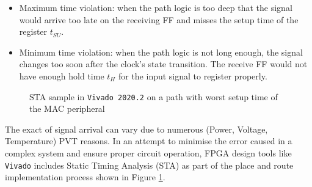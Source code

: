 \documentclass[a4paper]{report}
\newcommand{\code}{\texttt}
\begin{document}
\begin{itemize}
    \item Maximum time violation: when the path logic is too deep that the signal would arrive too late on the receiving FF and misses the setup time of the register $t_{SU}$.
    \item Minimum time violation: when the path logic is not long enough, the signal changes too soon after the clock's state transition. The receive FF would not have enough hold time $t_{H}$ for the input signal to register properly.
\end{itemize}

\begin{figure}[h!]
  \caption{STA sample in \code{Vivado 2020.2} on a path with worst setup time of the MAC peripheral}
  \label{fig:sta-in-action}
\end{figure}

The exact of signal arrival can vary due to numerous (Power, Voltage, Temperature) PVT reasons. In an attempt to minimise the error caused in a complex system and ensure proper circuit operation, FPGA design tools like \code{Vivado} includes Static Timing Analysis (STA) as part of the place and route implementation process shown in Figure \ref{fig:sta-in-action}.
\end{document}
